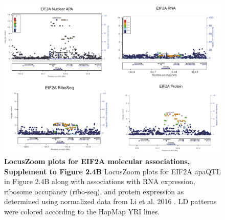 \begin{figure}[!htb]
\centering
\includegraphics[width=5in]{img/ch02/Fig4_figuresupplement2.pdf}
\caption[LocusZoom plots for EIF2A molecular associations, Supplement to Figure 2.4B]{\textbf{LocusZoom plots for EIF2A molecular associations, Supplement to Figure 2.4B} LocusZoom plots for EIF2A apaQTL in Figure 2.4B along with associations with RNA expression, ribosome occupancy (ribo-seq), and protein expression as determined using normalized data from Li et al. 2016 \citep{li_rna_2016}. LD patterns were colored according to the HapMap YRI lines.}
\label{fig:locuszoom}
\end{figure}
\clearpage



